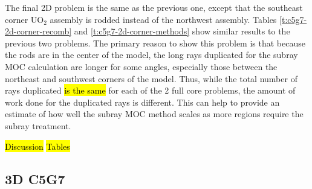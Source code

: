 \begin{table}
    \centering
    \caption{2D C5G7 corner assembly rod withdrawal eigenvalue and pin power differences for each decusping method}\label{t:c5g7-2d-corner-methods}
\end{table}

The final 2D problem is the same as the previous one, except that the southeast corner UO$_2$ assembly is rodded instead of the northwest assembly.  Tables \ref{t:c5g7-2d-corner-recomb} and \ref{t:c5g7-2d-corner-methods} show similar results to the previous two problems.  The primary reason to show this problem is that because the rods are in the center of the model, the long rays duplicated for the subray MOC calculation are longer for some angles, especially those between the northeast and southwest corners of the model.  Thus, while the total number of rays duplicated \hl{is the same} for each of the 2 full core problems, the amount of work done for the duplicated rays is different.  This can help to provide an estimate of how well the subray MOC method scales as more regions require the subray treatment.

\hl{Discussion}
\hl{Tables}

\subsection{3D C5G7}
